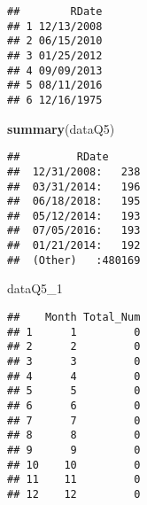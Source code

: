 \documentclass[]{article}
\newenvironment{Shaded}{\begin{snugshade}}{\end{snugshade}}
\newcommand{\ControlFlowTok}[1]{\textcolor[rgb]{0.13,0.29,0.53}{\textbf{#1}}}
\newcommand{\DecValTok}[1]{\textcolor[rgb]{0.00,0.00,0.81}{#1}}
\newcommand{\KeywordTok}[1]{\textcolor[rgb]{0.13,0.29,0.53}{\textbf{#1}}}
\newcommand{\NormalTok}[1]{#1}
\newcommand{\OperatorTok}[1]{\textcolor[rgb]{0.81,0.36,0.00}{\textbf{#1}}}
\newcommand{\StringTok}[1]{\textcolor[rgb]{0.31,0.60,0.02}{#1}}
\begin{document}
\begin{verbatim}
##        RDate
## 1 12/13/2008
## 2 06/15/2010
## 3 01/25/2012
## 4 09/09/2013
## 5 08/11/2016
## 6 12/16/1975
\end{verbatim}

\begin{Shaded}
\begin{Highlighting}[]
\KeywordTok{summary}\NormalTok{(dataQ5)}
\end{Highlighting}
\end{Shaded}

\begin{verbatim}
##         RDate       
##  12/31/2008:   238  
##  03/31/2014:   196  
##  06/18/2018:   195  
##  05/12/2014:   193  
##  07/05/2016:   193  
##  01/21/2014:   192  
##  (Other)   :480169
\end{verbatim}

\begin{Shaded}
\begin{Highlighting}[]
\NormalTok{dataQ5_}\DecValTok{1}
\end{Highlighting}
\end{Shaded}

\begin{verbatim}
##    Month Total_Num
## 1      1         0
## 2      2         0
## 3      3         0
## 4      4         0
## 5      5         0
## 6      6         0
## 7      7         0
## 8      8         0
## 9      9         0
## 10    10         0
## 11    11         0
## 12    12         0
\end{verbatim}

\begin{Shaded}
\end{Shaded}

\begin{Shaded}
\end{Shaded}
\end{document}
